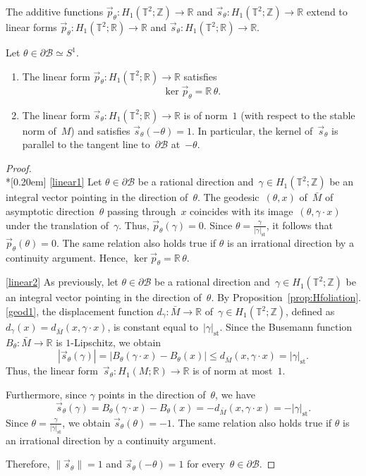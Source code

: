 \documentclass[AHL,Unicode,longabstracts,published]{cedram}
\newcommand{\B}{\mathcal{B}}
\newcommand{\Z}{\mathbb{Z}}
\newcommand{\R}{\mathbb{R}}
\newcommand{\T}{\mathbb{T}}
\newcommand{\rst}{\mathrm{st}}
\begin{document}
The additive functions $\vec{p}_\theta:H_1(\T^2;\Z) \to \R$ and $\vec{s}_\theta:H_1(\T^2;\Z) \to \R$ extend to linear forms $\vec{p}_\theta:H_1(\T^2;\R) \to \R$ and $\vec{s}_\theta:H_1(\T^2;\R) \to \R$.

\begin{lemm}\label{lem:linear}
Let $\theta \in \partial \B \simeq S^1$.
\begin{enumerate}
\item\label{linear1} The linear form $\vec{p}_\theta:H_1(\T^2;\R) \to \R$ satisfies
\begin{equation*}\label{eq:kervp}
\ker \vec{p}_\theta = \R \, \theta.
\end{equation*}
\item\label{linear2} The linear form $\vec{s}_\theta:H_1(\T^2;\R) \to \R$ is of norm~$1$ (with respect to the stable norm of~$M$) and satisfies $\vec{s}_\theta(-\theta)=1$. In particular, the kernel of~$\vec{s}_\theta$ is parallel to the tangent line to~$\partial \B$ at~$-\theta$. 
\end{enumerate}
\end{lemm}

\begin{proof}\ \\*[0.20em]
\noindent\eqref{linear1} Let $\theta \in \partial \B$ be a rational direction and~$\gamma \in H_1(\T^2;\Z)$ be an integral vector pointing in the direction of~$\theta$. The geodesic~$(\theta,x)$ of~$\bar{M}$ of asymptotic direction~$\theta$ passing through~$x$ coincides with its image~$(\theta,\gamma \cdot x)$ under the translation of~$\gamma$. Thus, $\vec{p}_\theta(\gamma)=0$. Since $\theta = \frac{\gamma}{|\gamma|_{\rst}}$, it follows that $\vec{p}_\theta(\theta)=0$. The same relation also holds true if $\theta$ is an irrational direction by a continuity argument. Hence, $\ker \vec{p}_\theta = \R \, \theta$.

\noindent\eqref{linear2} As previously, let $\theta \in \partial \B$ be a rational direction and~$\gamma \in H_1(\T^2;\Z)$ be an integral vector pointing in the direction of~$\theta$. By Proposition~\ref{prop:Hfoliation}.\eqref{geod1}, the displacement function $d_\gamma : \bar{M} \to \R$ of~$\gamma \in H_1(\T^2;\Z)$, defined as $d_\gamma(x)=d_{\bar{M}}(x,\gamma \cdot x)$, is constant equal to~$|\gamma|_{\rst}$. Since the Busemann function~$B_\theta:\bar{M} \to \R$ is $1$-Lipschitz, we obtain
\[
|\vec{s}_\theta(\gamma)| = |B_\theta(\gamma \cdot x) - B_\theta(x)| \leq d_{\bar{M}}(x,\gamma \cdot x) = |\gamma|_{\rst}.
\]
Thus, the linear form~$\vec{s}_\theta:H_1(M;\R) \to \R$ is of norm at most~$1$.

Furthermore, since $\gamma$ points in the direction of~$\theta$, we have
\[
\vec{s}_\theta(\gamma) = B_\theta(\gamma \cdot x) - B_\theta(x) = - d_{\bar{M}}(x,\gamma \cdot x) = - |\gamma|_{\rst}.
\]
Since $\theta = \frac{\gamma}{|\gamma|_{\rst}}$, we obtain $\vec{s}_\theta(\theta) = -1$. The same relation also holds true if $\theta$ is an irrational direction by a continuity argument.

Therefore, $\lVert \vec{s}_\theta \rVert = 1$ and $\vec{s}_\theta(-\theta) = 1$ for every~$\theta \in \partial \B$.
\end{proof}
\end{document}
